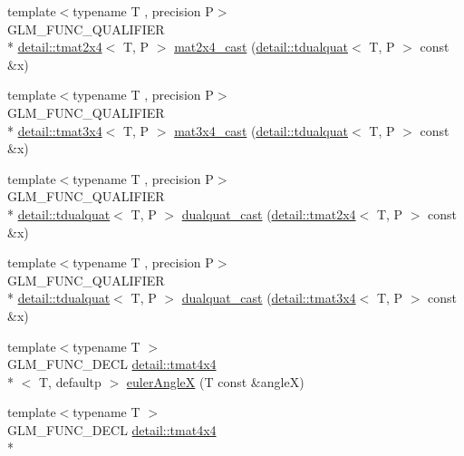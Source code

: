 \begin{DoxyCompactItemize}
\item 
{\footnotesize template$<$typename T , precision P$>$ }\\G\-L\-M\-\_\-\-F\-U\-N\-C\-\_\-\-Q\-U\-A\-L\-I\-F\-I\-E\-R \\*
\hyperlink{structglm_1_1detail_1_1tmat2x4}{detail\-::tmat2x4}$<$ T, P $>$ \hyperlink{group__gtc__dual__quaternion_gade155fb0dfc144259a25897776e73325}{mat2x4\-\_\-cast} (\hyperlink{structglm_1_1detail_1_1tdualquat}{detail\-::tdualquat}$<$ T, P $>$ const \&x)
\item 
{\footnotesize template$<$typename T , precision P$>$ }\\G\-L\-M\-\_\-\-F\-U\-N\-C\-\_\-\-Q\-U\-A\-L\-I\-F\-I\-E\-R \\*
\hyperlink{structglm_1_1detail_1_1tmat3x4}{detail\-::tmat3x4}$<$ T, P $>$ \hyperlink{group__gtc__dual__quaternion_ga2f4f0a1275fa95c272dd6ad6df75013d}{mat3x4\-\_\-cast} (\hyperlink{structglm_1_1detail_1_1tdualquat}{detail\-::tdualquat}$<$ T, P $>$ const \&x)
\item 
{\footnotesize template$<$typename T , precision P$>$ }\\G\-L\-M\-\_\-\-F\-U\-N\-C\-\_\-\-Q\-U\-A\-L\-I\-F\-I\-E\-R \\*
\hyperlink{structglm_1_1detail_1_1tdualquat}{detail\-::tdualquat}$<$ T, P $>$ \hyperlink{group__gtc__dual__quaternion_gad47c752ec23a5f9924e7d7f84c40f3e5}{dualquat\-\_\-cast} (\hyperlink{structglm_1_1detail_1_1tmat2x4}{detail\-::tmat2x4}$<$ T, P $>$ const \&x)
\item 
{\footnotesize template$<$typename T , precision P$>$ }\\G\-L\-M\-\_\-\-F\-U\-N\-C\-\_\-\-Q\-U\-A\-L\-I\-F\-I\-E\-R \\*
\hyperlink{structglm_1_1detail_1_1tdualquat}{detail\-::tdualquat}$<$ T, P $>$ \hyperlink{group__gtc__dual__quaternion_ga97c4fb8941ad1954e01578cca8182180}{dualquat\-\_\-cast} (\hyperlink{structglm_1_1detail_1_1tmat3x4}{detail\-::tmat3x4}$<$ T, P $>$ const \&x)
\item 
{\footnotesize template$<$typename T $>$ }\\G\-L\-M\-\_\-\-F\-U\-N\-C\-\_\-\-D\-E\-C\-L \hyperlink{structglm_1_1detail_1_1tmat4x4}{detail\-::tmat4x4}\\*
$<$ T, defaultp $>$ \hyperlink{group__gtx__euler__angles_ga97994e53d856ae89ed2622d66ab86c2c}{euler\-Angle\-X} (T const \&angle\-X)
\item 
{\footnotesize template$<$typename T $>$ }\\G\-L\-M\-\_\-\-F\-U\-N\-C\-\_\-\-D\-E\-C\-L \hyperlink{structglm_1_1detail_1_1tmat4x4}{detail\-::tmat4x4}\\*

\end{DoxyCompactItemize}

